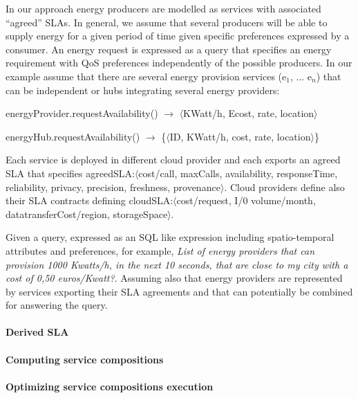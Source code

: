 In our approach energy producers are modelled as services with associated ``agreed'' SLAs. 
In general, we assume that several producers will be able to supply energy for a given period of time given specific  preferences expressed by a consumer. 
An energy request is expressed as a query that specifies an energy requirement with QoS preferences independently of the possible producers. In our example assume that there are several energy provision services ({\sf e$_1$, ... e$_n$}) that can be independent or hubs integrating several energy providers:
\begin{description}
\sf\footnotesize
\item energyProvider.requestAvailability() $\rightarrow$ $\langle$KWatt/h, Ecost, rate, location$\rangle$

\item energyHub.requestAvailability() $\rightarrow$  \{$\langle$ID, KWatt/h, cost, rate, location$\rangle$\}

\end{description}

Each service is deployed in different cloud provider and each exports an agreed SLA that specifies {\sf agreedSLA:$\langle$cost/call, maxCalls, availability, responseTime, reliability, privacy, precision, freshness, provenance$\rangle$}. Cloud providers define also their SLA contracts defining {\sf cloudSLA:$\langle$cost/request, I/0 volume/month, datatransferCost/region, storageSpace$\rangle$}. 

 Given a query, expressed as an SQL like expression including spatio-temporal attributes and preferences, for example, {\em List of energy providers that can provision 1000 Kwatts/h, in the next 10 seconds, that are close to my city with a cost of 0,50 euros/Kwatt?}. Assuming also that energy providers are represented by services exporting their SLA agreements and that can potentially be combined for answering the query. 
 
 \paragraph{Derived SLA}
 
  \paragraph{Computing service compositions}
  
   \paragraph{Optimizing service compositions execution}
 